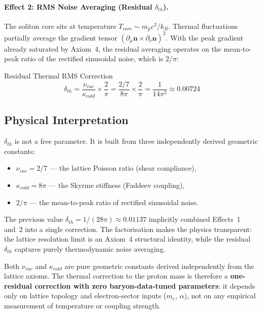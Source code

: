 \paragraph{Effect 2: RMS Noise Averaging (Residual $\delta_{th}$).}
The soliton core sits at temperature $T_{core} \sim m_p c^2/k_B$.  Thermal fluctuations partially average the gradient tensor $(\partial_\mu \mathbf{n} \times \partial_\nu \mathbf{n})^2$.  With the peak gradient already saturated by Axiom~4, the residual averaging operates on the mean-to-peak ratio of the rectified sinusoidal noise, which is $2/\pi$:
\begin{resultbox}{Residual Thermal RMS Correction}
\begin{equation}
    \delta_{th} = \frac{\nu_{vac}}{\kappa_{cold}} \times \frac{2}{\pi}
    = \frac{2/7}{8\pi} \times \frac{2}{\pi}
    = \frac{1}{14\pi^2} \approx 0.00724
    \label{eq:delta_th}
\end{equation}
\end{resultbox}

\subsection{Physical Interpretation}

$\delta_{th}$ is not a free parameter.  It is built from three independently derived geometric constants:
\begin{itemize}
    \item $\nu_{vac} = 2/7$ --- the lattice Poisson ratio (shear compliance),
    \item $\kappa_{cold} = 8\pi$ --- the Skyrme stiffness (Faddeev coupling),
    \item $2/\pi$ --- the mean-to-peak ratio of rectified sinusoidal noise.
\end{itemize}

The previous value $\delta_{th} = 1/(28\pi) \approx 0.01137$ implicitly combined Effects~1 and~2 into a single correction.  The factorisation makes the physics transparent: the lattice resolution limit is an Axiom~4 structural identity, while the residual $\delta_{th}$ captures purely thermodynamic noise averaging.

Both $\nu_{vac}$ and $\kappa_{cold}$ are pure geometric constants derived independently from the lattice axioms.  The thermal correction to the proton mass is therefore a \textbf{one-residual correction with zero baryon-data-tuned parameters}: it depends only on lattice topology and electron-sector inputs ($m_e$, $\alpha$), not on any empirical measurement of temperature or coupling strength.

